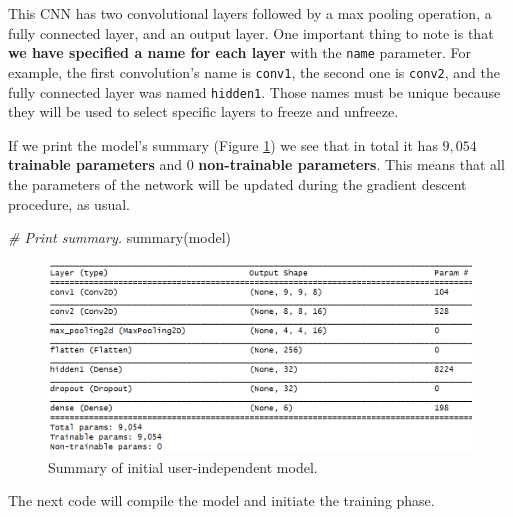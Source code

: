 \documentclass[
  11pt,
]{krantz}
\newenvironment{Shaded}{\begin{snugshade}}{\end{snugshade}}
\newcommand{\CommentTok}[1]{\textcolor[rgb]{0.37,0.37,0.37}{\textit{#1}}}
\newcommand{\FunctionTok}[1]{\textcolor[rgb]{0,0,0}{#1}}
\newcommand{\NormalTok}[1]{#1}
\begin{document}
This CNN has two convolutional layers followed by a max pooling operation, a fully connected layer, and an output layer. One important thing to note is that \textbf{we have specified a name for each layer} with the \texttt{name} parameter. For example, the first convolution's name is \texttt{conv1}, the second one is \texttt{conv2}, and the fully connected layer was named \texttt{hidden1}. Those names must be unique because they will be used to select specific layers to freeze and unfreeze.

If we print the model's summary (Figure \ref{fig:adaptSummary1}) we see that in total it has \(9,054\) \textbf{trainable parameters} and \(0\) \textbf{non-trainable parameters}. This means that all the parameters of the network will be updated during the gradient descent procedure, as usual.

\begin{Shaded}
\begin{Highlighting}[]
\CommentTok{\# Print summary.}
\FunctionTok{summary}\NormalTok{(model)}
\end{Highlighting}
\end{Shaded}

\begin{figure}

{\centering \includegraphics[width=0.9\linewidth]{images/adaptive_summary} 

}

\caption{Summary of initial user-independent model.}\label{fig:adaptSummary1}
\end{figure}

The next code will compile the model and initiate the training phase.
\end{document}
